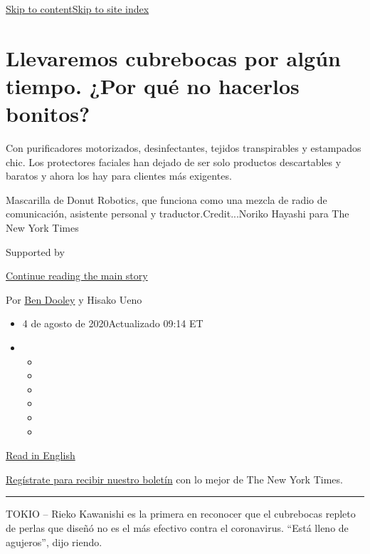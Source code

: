 \protect\hyperlink{site-content}{Skip to
content}\protect\hyperlink{site-index}{Skip to site index}

\hypertarget{llevaremos-cubrebocas-por-alguxfan-tiempo-por-quuxe9-no-hacerlos-bonitos}{%
\section{Llevaremos cubrebocas por algún tiempo. ¿Por qué no hacerlos
bonitos?}\label{llevaremos-cubrebocas-por-alguxfan-tiempo-por-quuxe9-no-hacerlos-bonitos}}

Con purificadores motorizados, desinfectantes, tejidos transpirables y
estampados chic. Los protectores faciales han dejado de ser solo
productos descartables y baratos y ahora los hay para clientes más
exigentes.

Mascarilla de Donut Robotics, que funciona como una mezcla de radio de
comunicación, asistente personal y traductor.Credit...Noriko Hayashi
para The New York Times

Supported by

\protect\hyperlink{after-sponsor}{Continue reading the main story}

Por \href{https://www.nytimes.com/by/ben-dooley}{Ben Dooley} y Hisako
Ueno

\begin{itemize}
\item
  4 de agosto de 2020Actualizado 09:14 ET
\item
  \begin{itemize}
  \item
  \item
  \item
  \item
  \item
  \item
  \end{itemize}
\end{itemize}

\href{https://www.nytimes.com/2020/07/27/business/fashion-masks-coronavirus.html}{Read
in English}

\href{https://www.nytimes.com/newsletters/el-times}{Regístrate para
recibir nuestro boletín} con lo mejor de The New York Times.

\begin{center}\rule{0.5\linewidth}{\linethickness}\end{center}

TOKIO -- Rieko Kawanishi es la primera en reconocer que el cubrebocas
repleto de perlas que diseñó no es el más efectivo contra el
coronavirus. ``Está lleno de agujeros'', dijo riendo.

